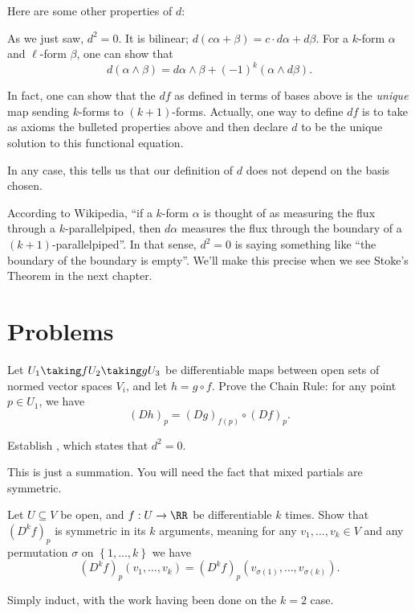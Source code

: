 \documentclass[11pt]{scrreprt}
\begin{document}
Here are some other properties of $d$:
\begin{itemize}
	\ii As we just saw, $d^2 = 0$.
	\ii It is bilinear; $d(c\alpha+\beta) = c \cdot d\alpha + d\beta$.
	\ii For a $k$-form $\alpha$ and $\ell$-form $\beta$, one can show that
	\[ d(\alpha \wedge \beta) = d\alpha \wedge \beta + (-1)^k (\alpha \wedge d\beta). \]
\end{itemize}
In fact, one can show that the $df$ as defined in terms of bases above is
the \emph{unique} map sending $k$-forms to $(k+1)$-forms.
Actually, one way to define $df$ is to take as axioms the bulleted properties above
and then declare $d$ to be the unique solution to this functional equation.

In any case, this tells us that our definition of $d$ does not depend on the basis chosen.

According to Wikipedia, ``if a $k$-form $\alpha$ is thought of as measuring the flux through a $k$-parallelpiped,
then $d\alpha$ measures the flux through the boundary of a $(k+1)$-parallelpiped''.
In that sense, $d^2 = 0$ is saying something like ``the boundary of the boundary is empty''.
We'll make this precise when we see Stoke's Theorem in the next chapter.

\section{Problems}
\begin{sproblem}
	Let $U_1 \taking f U_2 \taking g U_3$ be differentiable maps
	between open sets of normed vector spaces $V_i$, and let $h = g \circ f$.
	Prove the Chain Rule: for any point $p \in U_1$, we have
	\[ (Dh)_p = (Dg)_{f(p)} \circ (Df)_p. \]
\end{sproblem}
\begin{problem}
	\label{prob:dd_zero}
	Establish , which states that $d^2 = 0$.
	\begin{hint}
		This is just a summation.
		You will need the fact that mixed partials are symmetric.
	\end{hint}
\end{problem}
\begin{problem}
	Let $U \subseteq V$ be open, and $f : U \to \RR$ be differentiable $k$ times.
	Show that $(D^kf)_p$ is symmetric in its $k$ arguments, meaning for any $v_1, \dots, v_k \in V$
	and any permutation $\sigma$ on $\left\{ 1, \dots, k \right\}$ we have
	\[ (D^kf)_p(v_1, \dots, v_k) = (D^kf)_p(v_{\sigma(1)}, \dots, v_{\sigma(k)}). \]
	\begin{hint}
		Simply induct, with the work having been done on the $k=2$ case.
	\end{hint}
\end{problem}
\end{document}

